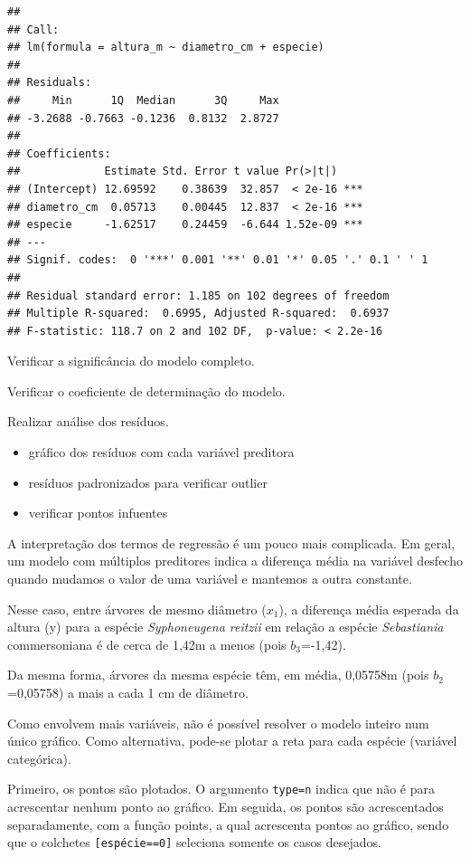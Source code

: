 \documentclass[12pt,brazil,]{book}
\providecommand{\tightlist}{%
  \setlength{\itemsep}{0pt}\setlength{\parskip}{0pt}}
\begin{document}
\begin{verbatim}
## 
## Call:
## lm(formula = altura_m ~ diametro_cm + especie)
## 
## Residuals:
##     Min      1Q  Median      3Q     Max 
## -3.2688 -0.7663 -0.1236  0.8132  2.8727 
## 
## Coefficients:
##             Estimate Std. Error t value Pr(>|t|)    
## (Intercept) 12.69592    0.38639  32.857  < 2e-16 ***
## diametro_cm  0.05713    0.00445  12.837  < 2e-16 ***
## especie     -1.62517    0.24459  -6.644 1.52e-09 ***
## ---
## Signif. codes:  0 '***' 0.001 '**' 0.01 '*' 0.05 '.' 0.1 ' ' 1
## 
## Residual standard error: 1.185 on 102 degrees of freedom
## Multiple R-squared:  0.6995, Adjusted R-squared:  0.6937 
## F-statistic: 118.7 on 2 and 102 DF,  p-value: < 2.2e-16
\end{verbatim}

Verificar a significância do modelo completo.

Verificar o coeficiente de determinação do modelo.

Realizar análise dos resíduos.

\begin{itemize}
\tightlist
\item
  gráfico dos resíduos com cada variável preditora
\item
  resíduos padronizados para verificar outlier
\item
  verificar pontos infuentes
\end{itemize}

A interpretação dos termos de regressão é um pouco mais complicada. Em
geral, um modelo com múltiplos preditores indica a diferença média na
variável desfecho quando mudamos o valor de uma variável e mantemos a
outra constante.

Nesse caso, entre árvores de mesmo diâmetro (\(x_1\)), a diferença média
esperada da altura (y) para a espécie \emph{Syphoneugena reitzii} em
relação a espécie \emph{Sebastiania} commersoniana é de cerca de 1,42m a
menos (pois \(b_3\)=-1,42).

Da mesma forma, árvores da mesma espécie têm, em média, 0,05758m (pois
\(b_2\)=0,05758) a mais a cada 1 cm de diâmetro.

Como envolvem mais variáveis, não é possível resolver o modelo inteiro
num único gráfico. Como alternativa, pode-se plotar a reta para cada
espécie (variável categórica).

Primeiro, os pontos são plotados. O argumento
\texttt{type=\textquotesingle{}n\textquotesingle{}} indica que não é
para acrescentar nenhum ponto ao gráfico. Em seguida, os pontos são
acrescentados separadamente, com a função points, a qual acrescenta
pontos ao gráfico, sendo que o colchetes \texttt{{[}espécie==0{]}}
seleciona somente os casos desejados.
\end{document}
